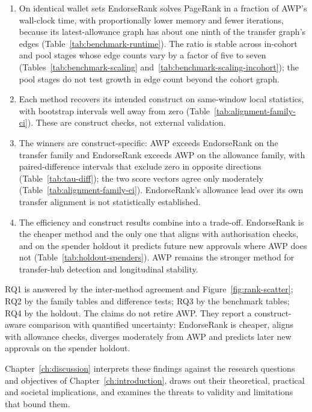 \begin{enumerate}
\item[C1.] On identical wallet sets EndorseRank solves PageRank in a fraction of AWP's wall-clock time, with proportionally lower memory and fewer iterations, because its latest-allowance graph has about one ninth of the transfer graph's edges (Table~\ref{tab:benchmark-runtime}). The ratio is stable across in-cohort and pool stages whose edge counts vary by a factor of five to seven (Tables~\ref{tab:benchmark-scaling} and~\ref{tab:benchmark-scaling-incohort}); the pool stages do not test growth in edge count beyond the cohort graph.
\item[C2.] Each method recovers its intended construct on same-window local statistics, with bootstrap intervals well away from zero (Table~\ref{tab:alignment-family-ci}). These are construct checks, not external validation.
\item[C3.] The winners are construct-specific: AWP exceeds EndorseRank on the transfer family and EndorseRank exceeds AWP on the allowance family, with paired-difference intervals that exclude zero in opposite directions (Table~\ref{tab:tau-diff}); the two score vectors agree only moderately (Table~\ref{tab:alignment-family-ci}). EndorseRank's allowance lead over its own transfer alignment is not statistically established.
\item[C4.] The efficiency and construct results combine into a trade-off. EndorseRank is the cheaper method and the only one that aligns with authorisation checks, and on the spender holdout it predicts future new approvals where AWP does not (Table~\ref{tab:holdout-spenders}). AWP remains the stronger method for transfer-hub detection and longitudinal stability.
\end{enumerate}

RQ1 is answered by the inter-method agreement and Figure~\ref{fig:rank-scatter}; RQ2 by the family tables and difference tests; RQ3 by the benchmark tables; RQ4 by the holdout. The claims do not retire AWP. They report a construct-aware comparison with quantified uncertainty: EndorseRank is cheaper, aligns with allowance checks, diverges moderately from AWP and predicts later new approvals on the spender holdout.

Chapter~\ref{ch:discussion} interprets these findings against the research questions and objectives of Chapter~\ref{ch:introduction}, draws out their theoretical, practical and societal implications, and examines the threats to validity and limitations that bound them.
